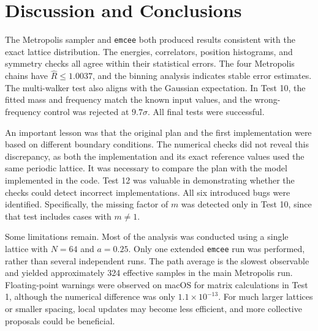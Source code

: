 \documentclass[11pt]{article}
\begin{document}
\section{Discussion and Conclusions}

The Metropolis sampler and \texttt{emcee} both produced results consistent with
the exact lattice distribution. The energies, correlators, position histograms,
and symmetry checks all agree within their statistical errors. The four
Metropolis chains have $\hat R \le 1.0037$, and the binning analysis indicates
stable error estimates. The multi-walker test also aligns with the Gaussian
expectation. In Test 10, the fitted mass and frequency match the known input
values, and the wrong-frequency control was rejected at $9.7\sigma$. All final
tests were successful.

An important lesson was that the original plan and the first implementation
were based on different boundary conditions. The numerical checks did not
reveal this discrepancy, as both the implementation and its exact reference
values used the same periodic lattice. It was necessary to compare the plan
with the model implemented in the code. Test 12 was valuable in demonstrating
whether the checks could detect incorrect implementations. All six introduced
bugs were identified. Specifically, the missing factor of $m$ was detected only
in Test 10, since that test includes cases with $m \ne 1$.

Some limitations remain. Most of the analysis was conducted using a single
lattice with $N = 64$ and $a = 0.25$. Only one extended \texttt{emcee} run was
performed, rather than several independent runs. The path average is the
slowest observable and yielded approximately 324 effective samples in the main
Metropolis run. Floating-point warnings were observed on macOS for matrix
calculations in Test 1, although the numerical difference was only
$1.1\times10^{-13}$. For much larger lattices or smaller spacing, local updates
may become less efficient, and more collective proposals could be beneficial.
\end{document}
